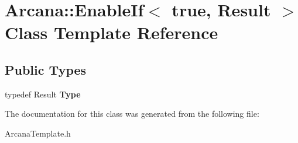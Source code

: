 \hypertarget{class_arcana_1_1_enable_if_3_01true_00_01_result_01_4}{}\section{Arcana\+:\+:Enable\+If$<$ true, Result $>$ Class Template Reference}
\label{class_arcana_1_1_enable_if_3_01true_00_01_result_01_4}
\subsection*{Public Types}
\begin{DoxyCompactItemize}
\item 
\mbox{\label{class_arcana_1_1_enable_if_3_01true_00_01_result_01_4_abbf31073a38625a38a1a6341fcc4798c}} 
typedef Result {\bfseries Type}
\end{DoxyCompactItemize}


The documentation for this class was generated from the following file\+:\begin{DoxyCompactItemize}
\item 
Arcana\+Template.\+h\end{DoxyCompactItemize}
